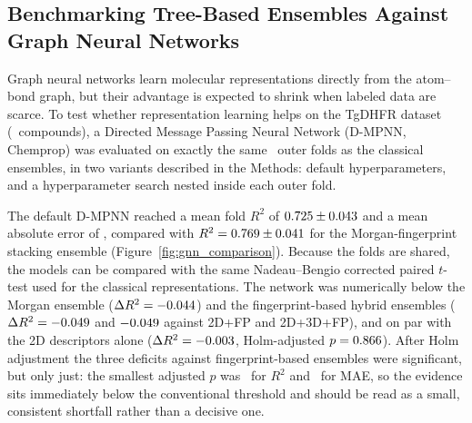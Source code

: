 \subsection{Benchmarking Tree-Based Ensembles Against Graph Neural Networks}
\label{sec:gnn_results}

Graph neural networks learn molecular representations directly from the atom--bond graph, but their advantage is expected to shrink when labeled data are scarce. To test whether representation learning helps on the TgDHFR dataset (\NCompounds\ compounds), a Directed Message Passing Neural Network (D-MPNN, Chemprop) was evaluated on exactly the same \TotalOuterFolds\ outer folds as the classical ensembles, in two variants described in the Methods: default hyperparameters, and a hyperparameter search nested inside each outer fold.

The default D-MPNN reached a mean fold $R^2$ of $0.725 \pm 0.043$ and a mean absolute error of \ChemPropDMPNNFoldMae, compared with $R^2 = 0.769 \pm 0.041$ for the Morgan-fingerprint stacking ensemble (Figure~\ref{fig:gnn_comparison}). Because the folds are shared, the models can be compared with the same Nadeau--Bengio corrected paired $t$-test used for the classical representations. The network was numerically below the Morgan ensemble ($\Delta R^2 = -0.044$) and the fingerprint-based hybrid ensembles ($\Delta R^2 = -0.049$ and $-0.049$ against 2D+FP and 2D+3D+FP), and on par with the 2D descriptors alone ($\Delta R^2 = -0.003$, Holm-adjusted $p = 0.866$). After Holm adjustment the three deficits against fingerprint-based ensembles were significant, but only just: the smallest adjusted $p$ was \GnnVsMinPRTwo\ for $R^2$ and \GnnVsMinPMae\ for MAE, so the evidence sits immediately below the conventional threshold and should be read as a small, consistent shortfall rather than a decisive one.

